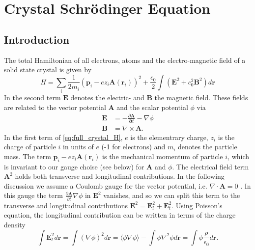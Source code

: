 \section{Crystal Schr\"{o}dinger Equation}


\subsection{Introduction}

The total Hamiltonian of all electrons, atoms and the electro-magnetic
field of a solid state crystal is given by\begin{equation}
H=\sum_{i}\frac{1}{2m_{i}}\left(\mathbf{p}_{i}-ez_{i}\mathbf{A}\left(\mathbf{r}_{i}\right)\right)^{2}+\frac{\epsilon_{0}}{2}\int\left(\mathbf{E}^{2}+c_{0}^{2}\mathbf{B}^{2}\right)d\mathbf{r}\label{eq:full_crystal_H}\end{equation}
In the second term $\mathbf{E}$ denotes the electric- and $\mathbf{B}$
the magnetic field. These fields are related to the vector potential
$\mathbf{A}$ and the scalar potential $\phi$ via \citet{Jackson1998}\begin{align}
\mathbf{E} & =-\frac{\partial\mathbf{A}}{\mathbf{\partial}t}-\nabla\phi\label{eq:E_potentials}\\
\mathbf{B} & =\nabla\times\mathbf{A}.\label{eq:B_vector_potential}\end{align}
In the first term of \ref{eq:full_crystal_H}, $e$ is the elementrary
charge, $z_{i}$ is the charge of particle $i$ in units of $e$ (-1
for electrons) and $m_{i}$ denotes the particle mass. The term $\mathbf{p}_{i}-ez_{i}\mathbf{A}\left(\mathbf{r}_{i}\right)$
is the mechanical momentum of particle $i$, which is invariant to
our gauge choise (see below) for $\mathbf{A}$ and $\phi$. The electrical
field term $\mathbf{A}^{2}$ holds both transverse and longitudinal
contributions. In the following discussion we assume a Coulomb gauge
for the vector potential, i.e. $\nabla\cdot\mathbf{A}=0$ \citet{Jackson1998}.
In this gauge the term $\frac{\partial\mathbf{A}}{\partial t}\nabla\phi$
in $\mathbf{E}^{2}$ vanishes, and so we can split this term to the
transverse and longitudinal contributions $\mathbf{E}^{2}=\mathbf{E}_{l}^{2}+\mathbf{E}_{t}^{2}$.
Using Poisson's equation, the longitudinal contribution can be written
in terms of the charge density \begin{equation}
\int\mathbf{E}_{l}^{2}d\mathbf{r}=\int\left(\nabla\phi\right)^{2}d\mathbf{r}=\langle\phi\nabla\phi\rangle-\int\phi\nabla^{2}\phi d\mathbf{r}=\int\phi\frac{\rho}{\epsilon_{0}}d\mathbf{r}.\end{equation}
